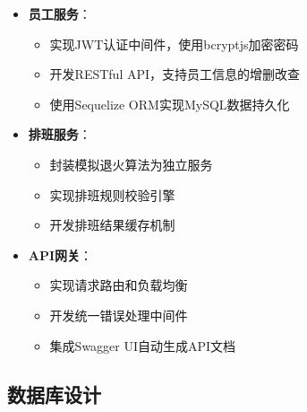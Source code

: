 \documentclass{ctexart}
\begin{document}
\begin{itemize}
    \item \textbf{员工服务}：
    \begin{itemize}
        \item 实现JWT认证中间件，使用bcryptjs加密密码
        \item 开发RESTful API，支持员工信息的增删改查
        \item 使用Sequelize ORM实现MySQL数据持久化
    \end{itemize}

    \item \textbf{排班服务}：
    \begin{itemize}
        \item 封装模拟退火算法为独立服务
        \item 实现排班规则校验引擎
        \item 开发排班结果缓存机制
    \end{itemize}

    \item \textbf{API网关}：
    \begin{itemize}
        \item 实现请求路由和负载均衡
        \item 开发统一错误处理中间件
        \item 集成Swagger UI自动生成API文档
    \end{itemize}
\end{itemize}

\subsection{数据库设计}
\end{document}
